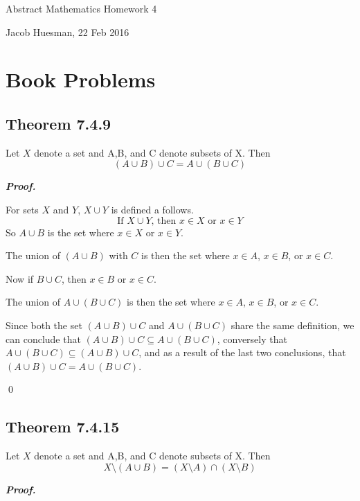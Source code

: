 \documentclass{article}
\begin{document}
\centerline{\sc \large Abstract Mathematics Homework 4}
\vspace{.5pc}
\centerline{\sc Jacob Huesman, 22 Feb 2016}

\vspace{2pc}


\section{Book Problems}
\subsection{Theorem 7.4.9}
Let $X$ denote a set and A,B, and C denote subsets of X. Then
\begin{equation}
	(A \cup B) \cup C = A \cup (B \cup C)
\end{equation}
	
\textbf{\textit{Proof.}}

For sets $X$ and $Y$, $X \cup Y$ is defined a follows.
\begin{equation}
	\text{If } X \cup Y \text{, then } x \in X \text{ or } x \in Y
\end{equation}
So $A \cup B$ is the set where $x \in X$ or $x \in Y$.

The union of $(A \cup B)$ with $C$ is then the set where $x \in A$, $x \in B$, or $x \in C$.

Now if $B \cup C$, then $x \in B$ or $x \in C$.

The union of $A \cup (B \cup C)$ is then the set where $x \in A$, $x \in B$, or $x \in C$.

Since both the set $(A \cup B) \cup C$ and $A \cup (B \cup C)$ share the same definition, we
can conclude that $(A \cup B) \cup C \subseteq A \cup (B \cup C)$, conversely that 
$A \cup (B \cup C) \subseteq (A \cup B) \cup C$, and as a result of the last two conclusions,
that $(A \cup B) \cup C = A \cup (B \cup C)$.

\qed


\pagebreak
\subsection{Theorem 7.4.15}
Let $X$ denote a set and A,B, and C denote subsets of X. Then
\begin{equation}
	X \setminus (A \cup B) = (X \setminus A) \cap (X \setminus B)
\end{equation}

\textbf{\textit{Proof.}}
	
\end{document}
